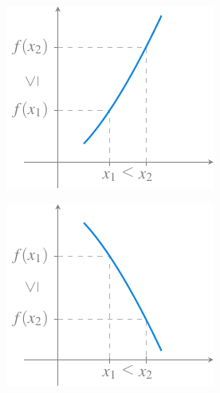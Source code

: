 \documentclass[
  a4paper,
]{scrreport}
\theoremstyle{definition}
\theoremstyle{plain}
\theoremstyle{definition}
\theoremstyle{definition}
\theoremstyle{plain}
\theoremstyle{plain}
\theoremstyle{remark}
\begin{document}
\begin{figure}

\begin{minipage}{0.50\linewidth}

\begin{figure}[H]

{\centering \includegraphics{./img/funciones/funcion-creciente.pdf}

}


\end{figure}%

\end{minipage}%
%
\begin{minipage}{0.50\linewidth}

\begin{figure}[H]

{\centering \includegraphics{./img/funciones/funcion-decreciente.pdf}

}


\end{figure}%

\end{minipage}%

\end{figure}%
\end{document}
